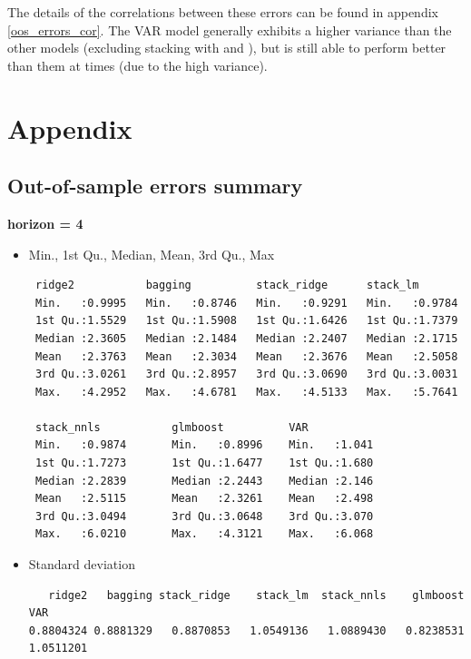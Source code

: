 The details of the correlations between these errors can be found in appendix \ref{oos_errors_cor}. The VAR model generally exhibits a higher variance than the other models (excluding stacking with  and ), but is still able to perform better than them at times (due to the high variance).    

\newpage

\section{Appendix}

\subsection{Out-of-sample errors summary}
\label{boxplot_summary}

\textbf{horizon = 4}

\begin{itemize}

\item Min., 1st Qu., Median, Mean, 3rd Qu., Max

\begin{verbatim}
 ridge2           bagging          stack_ridge      stack_lm         
 Min.   :0.9995   Min.   :0.8746   Min.   :0.9291   Min.   :0.9784   
 1st Qu.:1.5529   1st Qu.:1.5908   1st Qu.:1.6426   1st Qu.:1.7379   
 Median :2.3605   Median :2.1484   Median :2.2407   Median :2.1715      
 Mean   :2.3763   Mean   :2.3034   Mean   :2.3676   Mean   :2.5058      
 3rd Qu.:3.0261   3rd Qu.:2.8957   3rd Qu.:3.0690   3rd Qu.:3.0031      
 Max.   :4.2952   Max.   :4.6781   Max.   :4.5133   Max.   :5.7641
 
 stack_nnls           glmboost          VAR
 Min.   :0.9874       Min.   :0.8996    Min.   :1.041 
 1st Qu.:1.7273       1st Qu.:1.6477    1st Qu.:1.680
 Median :2.2839       Median :2.2443    Median :2.146
 Mean   :2.5115       Mean   :2.3261    Mean   :2.498
 3rd Qu.:3.0494       3rd Qu.:3.0648    3rd Qu.:3.070
 Max.   :6.0210       Max.   :4.3121    Max.   :6.068
\end{verbatim}

\item Standard deviation

\begin{verbatim}
   ridge2   bagging stack_ridge    stack_lm  stack_nnls    glmboost   VAR
0.8804324 0.8881329   0.8870853   1.0549136   1.0889430   0.8238531   1.0511201
\end{verbatim}

\end{itemize}

